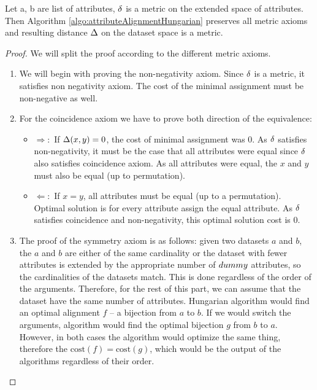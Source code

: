 \begin{theorem}
	\label{theorem:metricPreservation}
	Let a, b are list of attributes, $\delta$ is a metric on the extended space of attributes. Then Algorithm \ref{algo:attributeAlignmentHungarian} preserves all metric axioms and resulting distance $\Delta$ on the dataset space is a metric.
	\begin{proof} We will split the proof according to the different metric axioms.
	\begin{enumerate}
		\item We will begin with proving the non-negativity axiom. Since $\delta$ is a metric, it satisfies non negativity axiom. The cost of the minimal assignment must be non-negative as well.
		\item For the coincidence axiom we have to prove both direction of the equivalence:
		 \begin{itemize}
			\item $\Rightarrow:$ If $\Delta(x,y)=0$, the cost of minimal assignment was $0$. As $\delta$ satisfies non-negativity, it must be the case that all attributes were equal since $\delta$ also satisfies coincidence axiom. As all attributes were equal, the $x$ and $y$ must also be equal (up to permutation).
			\item $\Leftarrow:$ If $x=y$, all attributes must be equal (up to a permutation). Optimal solution is for every attribute assign the equal attribute. As $\delta$ satisfies coincidence and non-negativity, this optimal solution cost is 0.		
		\end{itemize}
		\item The proof of the symmetry axiom is as follows: given two datasets $a$ and $b$,
		the $a$ and $b$ are either of the same cardinality or the dataset with fewer attributes is extended by the appropriate number of  $dummy$ attributes, so the cardinalities of the datasets match. This is done regardless of the order of the arguments. Therefore, for the rest of this part, we can assume that the dataset have the same number of attributes. Hungarian algorithm would find an optimal alignment $f$ -- a bijection from $a$ to $b$. If we would switch the arguments, algorithm would find the optimal bijection $g$ from $b$ to $a$.
		However, in both cases the algorithm would optimize the same thing, therefore the $\text{cost}(f) = \text{cost}(g)$, which would be the output of the algorithms regardless of their order.

\end{enumerate}
\end{proof}
\end{theorem}
